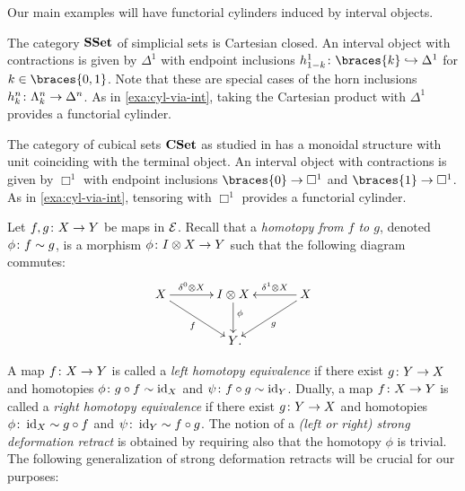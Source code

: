 \documentclass[reqno,10pt,a4paper,oneside,draft]{amsart}
\begin{document}
Our main examples will have functorial cylinders induced by interval objects.

\begin{example} \label{exa:cyl-in-sset}
The category $\mathbf{SSet}$ of simplicial sets is Cartesian closed.
An interval object with contractions is given by $\Delta^1$ with endpoint inclusions $h_{1-k}^1 \co \braces{k} \hookrightarrow \Delta^1$ for $k \in \braces{ 0, 1 }$.
Note that these are special cases of the horn inclusions $h_k^n \colon \Lambda_k^n \to \Delta^n$.
As in \cref{exa:cyl-via-int}, taking the Cartesian product with $\Delta^1$ provides a functorial cylinder.
\end{example}

\begin{example} \label{exa:cyl-in-cuset}
The category of cubical sets $\mathbf{CSet}$ as studied in \cite{coquand-variation} has a monoidal structure with unit coinciding with the terminal object.
An interval object with contractions is given by $\Box^1$ with endpoint inclusions $\braces{0} \to \Box^1$ and $\braces{1} \to \Box^1$.
As in \cref{exa:cyl-via-int}, tensoring with $\Box^1$ provides a functorial cylinder.
\end{example}

Let $f, g \colon X \to Y$ be maps in $\mathcal{E}$.
Recall that a \emph{homotopy from $f$ to $g$}, denoted $\phi \colon f \sim g$, is a morphism $\phi \colon I \otimes X \to Y$ such that the following diagram commutes:
\begin{equation}
\label{equ:homotopy}
\begin{gathered}
\xymatrix@C=1.2cm{
  X
  \ar[r]^-{\lcyl \otimes X}
  \ar[dr]_{f}
&
  \interval \otimes X
  \ar[d]^(0.4){\phi}
&
  X
  \ar[dl]^{g}
  \ar[l]_-{\rcyl \otimes X}
\\&
  Y
\rlap{.}}
\end{gathered}
\end{equation}

A map $f \colon X \to Y$ is called a \emph{left homotopy equivalence} if there exist $g \colon Y \to X$ and homotopies $\phi \colon g \mathbin{\circ} f \sim \operatorname{id}_X $ and $\psi \colon f \mathbin{\circ} g \sim \operatorname{id}_Y$.
Dually, a map $f \colon X \to Y$ is called a \emph{right homotopy equivalence} if there exist $g \colon Y \to X$ and homotopies $\phi \colon \operatorname{id}_X \sim g \mathbin{\circ} f$ and $\psi \colon \operatorname{id}_Y \sim f \mathbin{\circ} g$.
The notion of a \emph{(left or right) strong deformation retract} is obtained by requiring also that the homotopy $\phi$ is trivial.
The following generalization of strong deformation retracts will be crucial for our purposes:
\end{document}
